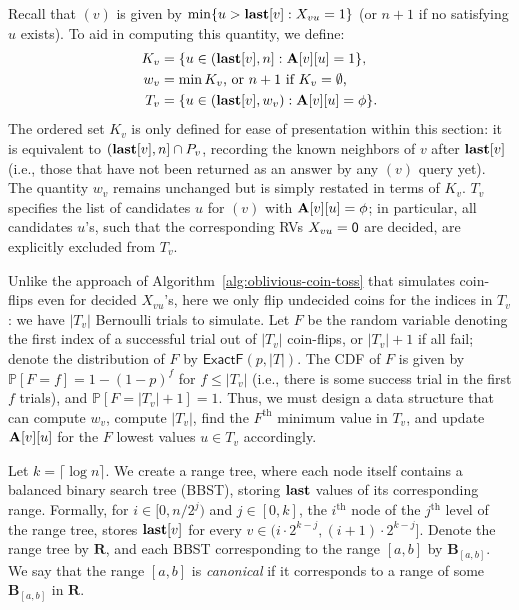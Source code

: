 Recall that $(v)$ is given by $\min\{u > \mathbf{last}[v]: X_{vu} = 1\}$ (or $n+1$ if no satisfying $u$ exists). To aid in computing this quantity, we define:
\begin{align*}
K_v &= \{u \in (\mathbf{last}[v], n]: \mathbf{A}[v][u]=1\},\\
w_v &= \min K_v \textrm{, or $n+1$ if $K_v = \emptyset$,} \\
T_v &= \{u \in (\mathbf{last}[v], w_v): \mathbf{A}[v][u] = \phi\}.
\end{align*}
The ordered set $K_v$ is only defined for ease of presentation within this section: it is equivalent to $(\mathbf{last}[v],n] \cap P_v$, recording the known neighbors of $v$ after $\mathbf{last}[v]$ (i.e., those that have not been returned as an answer by any $(v)$ query yet). The quantity $w_v$ remains unchanged but is simply restated in terms of $K_v$. $T_v$ specifies the list of candidates $u$ for $(v)$ with $\mathbf{A}[v][u] = \phi$; in particular, all candidates $u$'s, such that the corresponding RVs $X_{vu} = \mathsf{0}$ are decided, are explicitly excluded from $T_v$.

Unlike the approach of Algorithm~\ref{alg:oblivious-coin-toss} that simulates coin-flips even for decided $X_{vu}$'s, here we only flip undecided coins for the indices in $T_v$: we have $|T_v|$ Bernoulli trials to simulate. Let $F$ be the random variable denoting the first index of a successful trial out of $|T_v|$ coin-flips, or $|T_v|+1$ if all fail; denote the distribution of $F$ by $\mathsf{ExactF}(p,|T|)$. The CDF of $F$ is given by $\mathbb P[F = f] = 1-(1-p)^f$ for $f \leq |T_v|$ (i.e., there is some success trial in the first $f$ trials), and $\mathbb P[F = |T_v|+1] = 1$. Thus, we must design a data structure that can compute $w_v$, compute $|T_v|$, find the $F^\textrm{th}$ minimum value in $T_v$, and update $\mathbf{A}[v][u]$ for the $F$ lowest values $u \in T_v$ accordingly.

Let $k = \lceil \log n \rceil$. We create a range tree, where each node itself contains a balanced binary search tree (BBST), storing $\mathbf{last}$ values of its corresponding range. Formally, for $i \in [0, n/2^j)$ and $j \in [0, k]$, the $i^\textrm{th}$ node of the $j^\textrm{th}$ level of the range tree, stores $\mathbf{last}[v]$ for every $v \in (i \cdot 2^{k-j}, (i+1)\cdot 2^{k-j}]$. Denote the range tree by $\mathbf{R}$, and each BBST corresponding to the range $[a, b]$ by $\mathbf{B}_{[a,b]}$. We say that the range $[a,b]$  is \emph{canonical} if it corresponds to a range of some $\mathbf{B}_{[a,b]}$ in $\mathbf{R}$.

